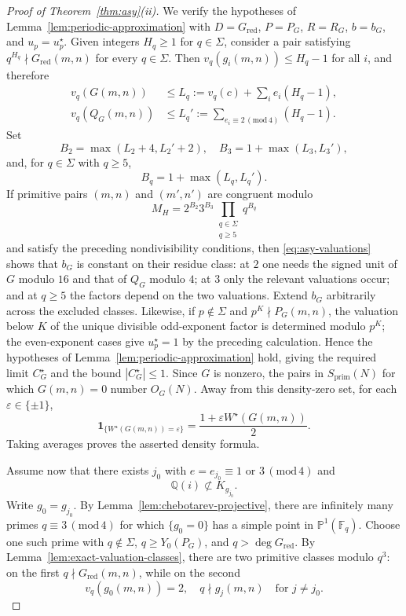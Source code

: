 \documentclass[12pt,reqno]{amsart}
\numberwithin{equation}{section}
\theoremstyle{definition}
\renewcommand{\le}{\leqslant}
\renewcommand{\ge}{\geqslant}
\newcommand{\PP}{\mathbb{P}}
\newcommand{\FF}{\mathbb{F}}
\newcommand{\QQ}{\mathbb{Q}}
\newcommand{\rw}{W}
\renewcommand{\pmod}[1]{\,(\mathrm{mod}\,#1)}
\begin{document}
\begin{proof}[Proof of Theorem~\ref{thm:asy}(ii)]
We verify the hypotheses of Lemma~\ref{lem:periodic-approximation} with $D=G_{\mathrm{red}}$, $P=P_G$, $R=R_G$, $b=b_G$, and $u_p=u_p^\star$.
Given integers $H_q\ge1$ for $q\in\Sigma$, consider a pair satisfying $q^{H_q}\nmid G_{\mathrm{red}}(m,n)$ for every $q\in\Sigma$.
Then $v_q(g_i(m,n))\le H_q-1$ for all $i$, and therefore
\begin{align*}
v_q(G(m,n))&\le L_q:=v_q(c)+\sum_i e_i(H_q-1),\\
v_q(Q_G(m,n))&\le L_q':=\sum_{e_i\equiv2\pmod4}(H_q-1).
\end{align*}
Set
\[
B_2=\max(L_2+4,L_2'+2),\quad
B_3=1+\max(L_3,L_3'),
\]
and, for $q\in \Sigma$ with $q\ge 5$,
\[
B_q=1+\max(L_q,L_q').
\]
If primitive pairs $(m,n)$ and $(m',n')$ are congruent modulo
\[
M_H=2^{B_2}3^{B_3}
\prod_{\substack{q\in \Sigma\\q\ge5}}q^{B_q}
\]
and satisfy the preceding nondivisibility conditions, then \eqref{eq:asy-valuations} shows that $b_G$ is constant on their residue class: at $2$ one needs the signed unit of $G$ modulo $16$ and that of $Q_G$ modulo $4$; at $3$ only the relevant valuations occur; and at $q\ge5$ the factors depend on the two valuations.
Extend $b_G$ arbitrarily across the excluded classes.
Likewise, if $p\notin\Sigma$ and $p^K\nmid P_G(m,n)$, the valuation below $K$ of the unique divisible odd-exponent factor is determined modulo $p^K$; the even-exponent cases give $u_p^\star=1$ by the preceding calculation.
Hence the hypotheses of Lemma~\ref{lem:periodic-approximation} hold, giving the required limit $C_G^\star$ and the bound $|C_G^\star|\le1$.
Since $G$ is nonzero, the pairs in $S_{\mathrm{prim}}(N)$ for which $G(m,n)=0$ number $O_G(N)$.
Away from this density-zero set, for each $\varepsilon\in\{\pm1\}$,
\[
\mathbf 1_{\{\rw^\star(G(m,n))=\varepsilon\}}
=\frac{1+\varepsilon\rw^\star(G(m,n))}{2}.
\]
Taking averages proves the asserted density formula.

Assume now that there exists $j_0$ with $e=e_{j_0}\equiv1$ or $3\pmod4$ and
\[
\QQ(i)\not\subset K_{g_{j_0}}.
\]
Write $g_0=g_{j_0}$.
By Lemma~\ref{lem:chebotarev-projective}, there are infinitely many primes $q\equiv3\pmod4$ for which $\{g_0=0\}$ has a simple point in $\PP^1(\FF_q)$.
Choose one such prime with $q\notin\Sigma$, $q\ge Y_0(P_G)$, and $q>\deg G_{\mathrm{red}}$.
By Lemma~\ref{lem:exact-valuation-classes}, there are two primitive classes modulo $q^3$: on the first $q\nmid G_{\mathrm{red}}(m,n)$, while on the second
\[
v_q(g_0(m,n))=2,\quad q\nmid g_j(m,n)\quad\text{for }j\ne j_0.
\]


\end{proof}
\end{document}
